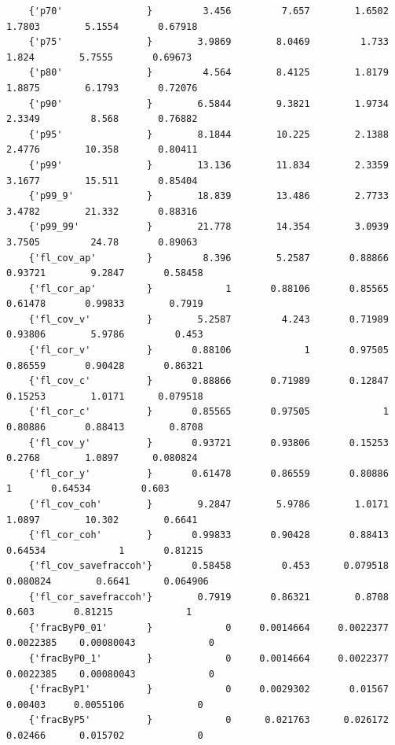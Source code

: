 \documentclass[
]{book}
\begin{document}
\begin{verbatim}
    {'p70'               }         3.456         7.657        1.6502        1.7803        5.1554       0.67918 
    {'p75'               }        3.9869        8.0469         1.733         1.824        5.7555       0.69673 
    {'p80'               }         4.564        8.4125        1.8179        1.8875        6.1793       0.72076 
    {'p90'               }        6.5844        9.3821        1.9734        2.3349         8.568       0.76882 
    {'p95'               }        8.1844        10.225        2.1388        2.4776        10.358       0.80411 
    {'p99'               }        13.136        11.834        2.3359        3.1677        15.511       0.85404 
    {'p99_9'             }        18.839        13.486        2.7733        3.4782        21.332       0.88316 
    {'p99_99'            }        21.778        14.354        3.0939        3.7505         24.78       0.89063 
    {'fl_cov_ap'         }         8.396        5.2587       0.88866       0.93721        9.2847       0.58458 
    {'fl_cor_ap'         }             1       0.88106       0.85565       0.61478       0.99833        0.7919 
    {'fl_cov_v'          }        5.2587         4.243       0.71989       0.93806        5.9786         0.453 
    {'fl_cor_v'          }       0.88106             1       0.97505       0.86559       0.90428       0.86321 
    {'fl_cov_c'          }       0.88866       0.71989       0.12847       0.15253        1.0171      0.079518 
    {'fl_cor_c'          }       0.85565       0.97505             1       0.80886       0.88413        0.8708 
    {'fl_cov_y'          }       0.93721       0.93806       0.15253        0.2768        1.0897      0.080824 
    {'fl_cor_y'          }       0.61478       0.86559       0.80886             1       0.64534         0.603 
    {'fl_cov_coh'        }        9.2847        5.9786        1.0171        1.0897        10.302        0.6641 
    {'fl_cor_coh'        }       0.99833       0.90428       0.88413       0.64534             1       0.81215 
    {'fl_cov_savefraccoh'}       0.58458         0.453      0.079518      0.080824        0.6641      0.064906 
    {'fl_cor_savefraccoh'}        0.7919       0.86321        0.8708         0.603       0.81215             1 
    {'fracByP0_01'       }             0     0.0014664     0.0022377     0.0022385    0.00080043             0 
    {'fracByP0_1'        }             0     0.0014664     0.0022377     0.0022385    0.00080043             0 
    {'fracByP1'          }             0     0.0029302       0.01567       0.00403     0.0055106             0 
    {'fracByP5'          }             0      0.021763      0.026172       0.02466      0.015702             0 

\end{verbatim}
\end{document}
